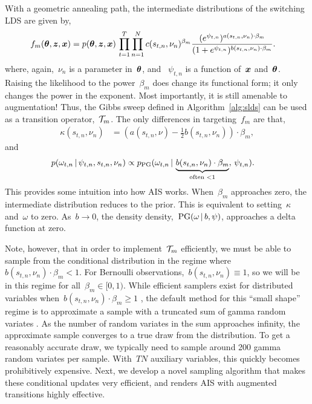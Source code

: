 With a geometric annealing path, the intermediate distributions of the 
switching LDS are given by,
\begin{align}
  \label{eq:intermediate}
  f_m(\boldsymbol{\theta}, \boldsymbol{z}, \boldsymbol{x}) 
  &= p(\boldsymbol{\theta}, \boldsymbol{z}, \boldsymbol{x}) \,  
    \prod_{t=1}^T \prod_{n=1}^N
    c(s_{t,n}, \nu_n)^{\beta_m} \frac{(e^{\psi_{t,n}})^{a(s_{t,n}, \nu_n) \cdot \beta_m}}
    {(1+e^{\psi_{t,n}})^{b(s_{t,n}, \nu_n) \cdot \beta_m}}.
\end{align}
where, again,~$\nu_n$ is a parameter in~$\boldsymbol{\theta}$, and ~$\psi_{t,n}$
is a function of~$\boldsymbol{x}$ and~$\boldsymbol{\theta}$.  Raising the likelihood to the
power~$\beta_m$ does change its functional form; it only changes the
power in the exponent.  Most importantly, it is still amenable to
\polyagamma augmentation!  Thus, the Gibbs sweep defined in
Algorithm~\ref{alg:slds} can be used as a transition
operator,~$\mathcal{T}_m$. The only differences in targeting~$f_m$ are that,
\begin{align*}
  \kappa(s_{t,n}, \nu_n) &= \left(a(s_{t,n}, \nu) - \frac{1}{2} b(s_{t,n}, \nu_n) \right) \cdot \beta_m,
\end{align*}
and
\begin{align*}
  \nonumber
  p({\omega}_{t,n} \,|\, \psi_{t,n}, s_{t,n}, \nu_n) 
  &\propto p_{\mathrm{PG}}({\omega}_{t,n} \,|\,
  \underbrace{b(s_{t,n}, \nu_n) \cdot \beta_m}_{\text{often } < 1}, \, \psi_{t,n}).
\end{align*}
This provides some intuition into how AIS works. When~$\beta_m$
approaches zero, the intermediate distribution reduces to the
prior. This is equivalent to setting~$\kappa$ and~$\omega$ to
zero. As~$b \to 0$, the density
\polyagamma density,~$\mathrm{PG}(\omega \,|\, b, \psi)$, approaches a
delta function at zero.

Note, however, that in order to implement~$\mathcal{T}_m$ efficiently, we
must be able to sample from the \polyagamma conditional distribution
in the regime where~${b(s_{t,n}, \nu_n) \cdot \beta_m < 1}$.  For
Bernoulli observations,~${b(s_{t,n}, \nu_n) \equiv 1}$, so we will be
in this regime for all~$\beta_m \in [0,1)$.  While efficient samplers
exist for \polyagamma distributed variables when~${b(s_{t,n}, \nu_n) \cdot \beta_m \geq 1}$ 
\citep{windle2014sampling}, the
default method for this ``small shape'' regime is to approximate a
\polyagamma sample with a truncated sum of gamma random variates
\citep{polson2013bayesian}.  As the number of random variates in the
sum approaches infinity, the approximate sample converges to a true
draw from the \polyagamma distribution. To get a reasonably accurate
draw, we typically need to sample around 200 gamma random variates per
\polyagamma sample.  With~$TN$ auxiliary variables, this quickly
becomes prohibitively expensive. Next, we develop a novel sampling
algorithm that makes these conditional updates very efficient, and
renders AIS with \polyagamma augmented transitions highly effective.

